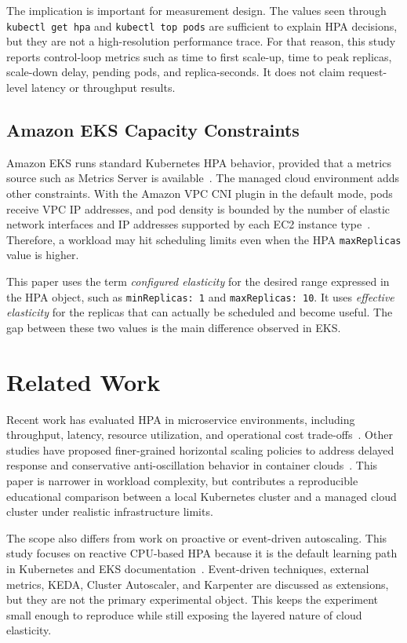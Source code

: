 \documentclass[conference]{IEEEtran}
\begin{document}
The implication is important for measurement design. The values seen through \texttt{kubectl get hpa} and \texttt{kubectl top pods} are sufficient to explain HPA decisions, but they are not a high-resolution performance trace. For that reason, this study reports control-loop metrics such as time to first scale-up, time to peak replicas, scale-down delay, pending pods, and replica-seconds. It does not claim request-level latency or throughput results.

\subsection{Amazon EKS Capacity Constraints}

Amazon EKS runs standard Kubernetes HPA behavior, provided that a metrics source such as Metrics Server is available~\cite{aws_eks_hpa}. The managed cloud environment adds other constraints. With the Amazon VPC CNI plugin in the default mode, pods receive VPC IP addresses, and pod density is bounded by the number of elastic network interfaces and IP addresses supported by each EC2 instance type~\cite{aws_eks_vpc_cni}. Therefore, a workload may hit scheduling limits even when the HPA \texttt{maxReplicas} value is higher.

This paper uses the term \emph{configured elasticity} for the desired range expressed in the HPA object, such as \texttt{minReplicas: 1} and \texttt{maxReplicas: 10}. It uses \emph{effective elasticity} for the replicas that can actually be scheduled and become useful. The gap between these two values is the main difference observed in EKS.

\section{Related Work}

Recent work has evaluated HPA in microservice environments, including throughput, latency, resource utilization, and operational cost trade-offs~\cite{buzato_goldman_2026_hpa}. Other studies have proposed finer-grained horizontal scaling policies to address delayed response and conservative anti-oscillation behavior in container clouds~\cite{jiang_wu_2021_fine_grained_hpa}. This paper is narrower in workload complexity, but contributes a reproducible educational comparison between a local Kubernetes cluster and a managed cloud cluster under realistic infrastructure limits.

The scope also differs from work on proactive or event-driven autoscaling. This study focuses on reactive CPU-based HPA because it is the default learning path in Kubernetes and EKS documentation~\cite{kubernetes_hpa_walkthrough,aws_eks_hpa}. Event-driven techniques, external metrics, KEDA, Cluster Autoscaler, and Karpenter are discussed as extensions, but they are not the primary experimental object. This keeps the experiment small enough to reproduce while still exposing the layered nature of cloud elasticity.
\end{document}
